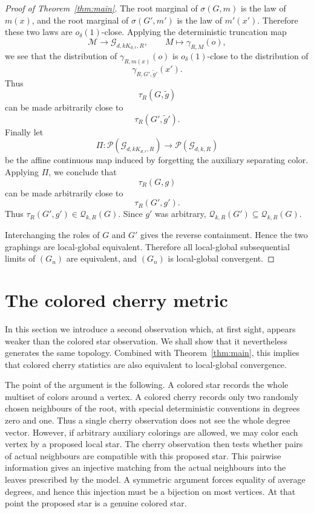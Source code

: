 \documentclass[11pt]{amsart}
\newcommand{\calG}{\mathcal G}
\newcommand{\calP}{\mathcal P}
\newcommand{\calQ}{\mathcal Q}
\theoremstyle{remark}
\begin{document}
\begin{proof}[Proof of Theorem~\ref{thm:main}]
The root marginal of $\sigma(G,m)$ is the law of $m(x)$, and the root marginal of $\sigma(G',m')$ is the law of $m'(x')$.  Therefore these two laws are $o_\delta(1)$-close.  Applying the deterministic truncation map
\[
 \mathcal M\to \calG_{d,kK_{d,r},R},\qquad M\mapsto \gamma_{R,M}(o),
\]
we see that the distribution of $\gamma_{R,m(x)}(o)$ is $o_\delta(1)$-close to the distribution of
\[
 \gamma_{R,G',\widetilde g'}(x').
\]
Thus
\[
 \tau_R(G,\widetilde g)
\]
can be made arbitrarily close to
\[
 \tau_R(G',\widetilde g').
\]
Finally let
\[
 \Pi\colon \calP(\calG_{d,kK_{d,r},R})\to \calP(\calG_{d,k,R})
\]
be the affine continuous map induced by forgetting the auxiliary separating color.  Applying $\Pi$, we conclude that
\[
 \tau_R(G,g)
\]
can be made arbitrarily close to
\[
 \tau_R(G',g').
\]
Thus $\tau_R(G',g')\in\calQ_{k,R}(G)$.  Since $g'$ was arbitrary, $\calQ_{k,R}(G')\subseteq\calQ_{k,R}(G)$.

Interchanging the roles of $G$ and $G'$ gives the reverse containment.  Hence the two graphings are local-global equivalent.  Therefore all local-global subsequential limits of $(G_n)$ are equivalent, and $(G_n)$ is local-global convergent.
\end{proof}

\section{The colored cherry metric}\label{sec:cherry}

In this section we introduce a second observation which, at first sight, appears weaker than the colored star observation. We shall show that it nevertheless generates the same topology. Combined with Theorem~\ref{thm:main}, this implies that colored cherry statistics are also equivalent to local-global convergence.

The point of the argument is the following. A colored star records the whole multiset of colors around a vertex. A colored cherry records only two randomly chosen neighbours of the root, with special deterministic conventions in degrees zero and one. Thus a single cherry observation does not see the whole degree vector. However, if arbitrary auxiliary colorings are allowed, we may color each vertex by a proposed local star. The cherry observation then tests whether pairs of actual neighbours are compatible with this proposed star. This pairwise information gives an injective matching from the actual neighbours into the leaves prescribed by the model. A symmetric argument forces equality of average degrees, and hence this injection must be a bijection on most vertices. At that point the proposed star is a genuine colored star.
\end{document}
